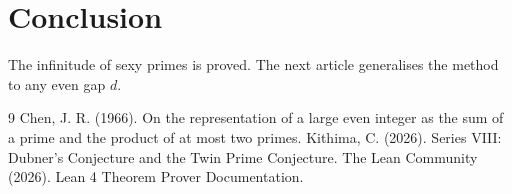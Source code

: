 \documentclass[11pt,a4paper]{article}
\begin{document}
\section{Conclusion}

The infinitude of sexy primes is proved. The next article generalises the method to any even gap $d$.


\begin{thebibliography}{9}
  Chen, J. R. (1966). On the representation of a large even integer as the sum of a prime and the product of at most two primes.
  Kithima, C. (2026). Series VIII: Dubner's Conjecture and the Twin Prime Conjecture.
  The Lean Community (2026). Lean 4 Theorem Prover Documentation.
\end{thebibliography}
\end{document}
